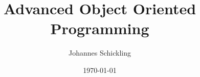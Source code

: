 \documentclass[a4paper]{article}
\begin{document}
\title{Advanced Object Oriented Programming}
\author{Johannes Schickling}
\date{\today}
\maketitle

\newpage
\tableofcontents









\end{document}
